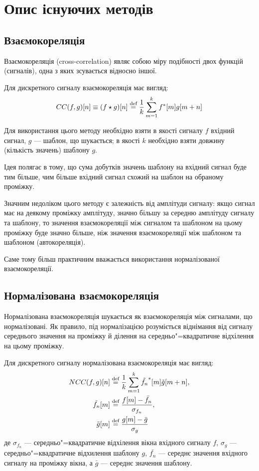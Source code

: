\section{Опис існуючих методів}
    \subsection{Взаємокореляція}
        Взаємокореляція (cross-correlation) являє собою міру подібності двох функцій (сигналів), одна з яких
        зсувається відносно іншої.

        Для дискретного сигналу взаємокореляція має вигляд:
        \begin{equation}
            CC(f,g)[ n ] \equiv (f \star g)[ n ] \stackrel{\text{def}}{=} \frac{1}{k}\sum\limits_{m=1}^{k} f^*[m] g[ m + n ]
        \end{equation}

        Для використання цього методу необхідно взяти в якості сигналу $f$ вхідний сигнал, $g$ --- шаблон, що
        шукається; в якості $k$ необхідно взяти довжину (кількість значень) шаблону $g$.

        Ідея полягає в тому, що сума добутків значень шаблону на вхідний сигнал буде тим більше, чим більше вхідний
        сигнал схожий на шаблон на обраному проміжку.

        Значним недоліком цього методу є залежність від амплітуди сигналу: якщо сигнал має на деякому проміжку
        амплітуду, значно більшу за середню амплітуду сигналу та шаблону, то значення взаємокореляції між сигналом та
        шаблоном на цьому проміжку буде значно більше, ніж значення взаємокореляції між шаблоном та шаблоном
        (автокореляція).

        Саме тому більш практичним вважається використання нормалізованої взаємокореляції.
    \subsection{Нормалізована взаємокореляція}
        Нормалізована взаємокореляція шукається як взаємокореляція між сигналами, що нормалізовані.
        Як правило, під нормалізацією розуміється віднімання від сигналу середнього значення на проміжку й ділення на
        середньо"=квадратичне відхілення на цьому проміжку.

        Для дискретного сигналу нормалізована взаємокореляція має вигляд:
        \begin{align}
            NCC(f,g)[ n ] &\stackrel{\text{def}}{=} \frac{1}{k} \sum\limits_{m=1}^{k} \tilde{f_n}^*[m] \tilde{g}[ m + n ],\\
            \tilde{f_n}[m] &\stackrel{\text{def}}{=} \frac{f[m] - \bar{f_n}}{\sigma_{f_n}},\\
            \tilde{g}[m]   &\stackrel{\text{def}}{=} \frac{g[m] - \bar{g}}{\sigma_g}
        \end{align}
        де $\sigma_{f_n}$ --- середньо"=квадратичне відхілення вікна вхідного сигналу $f$, $\sigma_g$ ---
        середньо"=квадратичне відхилення шаблону $g$, $\bar{f_n}$ --- середнє значення вхідного сигналу на проміжку
        вікна, а $\bar{g}$ --- середнє значення шаблону.


